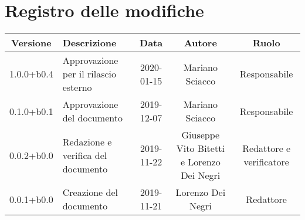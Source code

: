 \section*{Registro delle modifiche}

\begin{center}
	\begin{longtable}{|c|p{3cm}|c|c|c|}
	\hline
	\rowcolor{lighter-grayer}
	\textbf{Versione} & \textbf{Descrizione} & \textbf{Data} & \textbf{Autore} & \textbf{Ruolo} \\
	\hline
	\endfirsthead


	1.0.0+b0.4 & Approvazione per il rilascio esterno & 2020-01-15 & Mariano Sciacco & Responsabile \\
	\hline
	0.1.0+b0.1 & Approvazione del documento & 2019-12-07 & Mariano Sciacco & Responsabile \\
	\hline
	0.0.2+b0.0 & Redazione e verifica del documento & 2019-11-22 & Giuseppe Vito Bitetti e Lorenzo Dei Negri & Redattore e verificatore \\
	\hline
	0.0.1+b0.0 & Creazione del documento & 2019-11-21 & Lorenzo Dei Negri & Redattore \\

	\hline

	\end{longtable}
\end{center}
